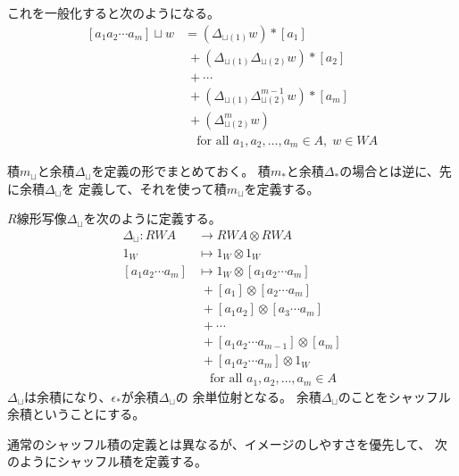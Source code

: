 	これを一般化すると次のようになる。
	\begin{equation*}\begin{split} %
		[a_1a_2\cdots a_m]\sqcup w
		& = (\Delta_{\sqcup(1)}w)*[a_1] \\
		&\; + (\Delta_{\sqcup(1)}\Delta_{\sqcup(2)}w)*[a_2] \\
		&\; + \cdots \\
		&\; + (\Delta_{\sqcup(1)}\Delta_{\sqcup(2)}^{m-1}w)*[a_{m}] \\
		&\; + (\Delta_{\sqcup(2)}^{m}w) \\
		&\quad\text{for all }a_1,a_2,\dots,a_m\in A,\;w\in WA
	\end{split}\end{equation*} %

	積$m_\sqcup$と余積$\Delta_\sqcup$を定義の形でまとめておく。
	積$m_*$と余積$\Delta_*$の場合とは逆に、先に余積$\Delta_\sqcup$を
	定義して、それを使って積$m_\sqcup$を定義する。

	\begin{definition}[シャッフル余積]\label{def:シャッフル余積} %
		$R$線形写像$\Delta_\sqcup$を次のように定義する。
		\begin{equation*}\begin{split} %
			\Delta_\sqcup: RWA &\to RWA\otimes RWA \\
			1_W &\mapsto 1_W\otimes 1_W \\
			[a_1a_2\cdots a_m] 
			& \mapsto 1_W\otimes [a_1a_2\cdots a_m] \\
			&\; + [a_1]\otimes [a_2\cdots a_m] \\
			&\; + [a_1a_2]\otimes [a_3\cdots a_m] \\
			&\; + \cdots \\
			&\; + [a_1a_2\cdots a_{m-1}]\otimes [a_m] \\
			&\; + [a_1a_2\cdots a_m]\otimes 1_W \\
			&\quad\text{for all }a_1,a_2,\dots,a_m\in A
		\end{split}\end{equation*} %
		$\Delta_\sqcup$は余積になり、$\epsilon_*$が余積$\Delta_\sqcup$の
		余単位射となる。
		余積$\Delta_\sqcup$のことをシャッフル余積ということにする。
	\end{definition} %

	通常のシャッフル積の定義とは異なるが、イメージのしやすさを優先して、
	次のようにシャッフル積を定義する。

